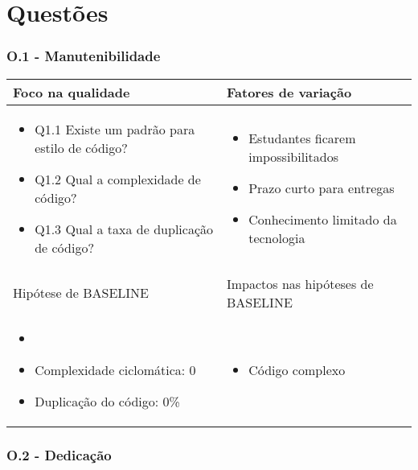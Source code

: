 \chapter{Questões}

\subsection{O.1 - Manutenibilidade}

	\begin{tabular}{ |p{6cm}|p{6cm}|  }
	 \hline
	 Foco na qualidade 		& 		Fatores de variação \\
	 \hline
	 \begin{itemize} \item Q1.1 Existe um padrão para estilo de código? \item Q1.2 Qual a complexidade de código? \item Q1.3 Qual a taxa de duplicação de código? \end{itemize} & \begin{itemize} \item Estudantes ficarem impossibilitados \item Prazo curto para entregas 
	 \item Conhecimento limitado da tecnologia \end{itemize}\\
	 \hline
	 Hipótese de BASELINE 		& 		Impactos nas hipóteses de BASELINE \\
	 \hline
	 \begin{itemize} \item \item Complexidade ciclomática: 0  \item Duplicação do código: 0\% \end{itemize} & \begin{itemize} \item Código complexo \end{itemize} \\
	 \hline
	\end{tabular}

\subsection{O.2 - Dedicação}

